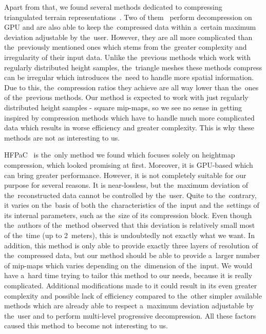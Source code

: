 Apart from that, we found several methods dedicated to compressing triangulated terrain representations~\cite{meshesGPU1, meshesGPU2, meshes}. Two of them~\cite{meshesGPU1, meshesGPU2} perform decompression on GPU and are also able to keep the~compressed data within a~certain maximum deviation adjustable by the~user. However, they are all more complicated than the~previously mentioned ones which stems from the~greater complexity and irregularity of their input data. Unlike the~previous methods which work with regularly distributed height samples, the~triangle meshes these methods compress can be irregular which introduces the~need to handle more spatial information. Due to this, the~compression ratios they achieve are all way lower than the~ones of the~previous methods. Our method is expected to work with just regularly distributed height samples - square mip-maps, so we see no sense in getting inspired by compression methods which have to handle much more complicated data which results in worse efficiency and greater complexity. This is why these methods are not as interesting to us.

HFPaC~\cite{fieldGPU} is the~only method we found which focuses solely on heightmap compression, which looked promising at first. Moreover, it is GPU-based which can bring greater performance. However, it is not completely suitable for our purpose for several reasons. It is near-lossless, but the~maximum deviation of the~reconstructed data cannot be controlled by the~user. Quite to the~contrary, it varies on the~basis of both the~characteristics of the~input and the~settings of its internal parameters, such as the~size of its compression block. Even though the~authors of the~method observed that this deviation is relatively small most of the~time (up to 2~meters), this is undoubtedly not exactly what we want. In addition, this method is only able to provide exactly three layers of resolution of the~compressed data, but our method should be able to provide a~larger number of mip-maps which varies depending on the~dimension of the~input. We would have a~hard time trying to tailor this method to our needs, because it is really complicated. Additional modifications made to it could result in its even greater complexity and possible lack of efficiency compared to the~other simpler available methods which are already able to respect a~maximum deviation adjustable by the~user and to perform multi-level progressive decompression. All these factors caused this method to become not interesting to us.

